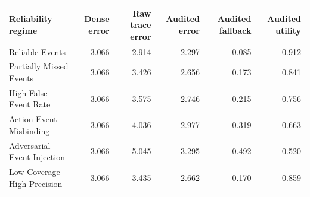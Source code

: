 \begin{tabular}{lrrrrr}
\toprule
Reliability regime & Dense error & Raw trace error & Audited error & Audited fallback & Audited utility \\
\midrule
Reliable Events & 3.066 & 2.914 & 2.297 & 0.085 & 0.912 \\
Partially Missed Events & 3.066 & 3.426 & 2.656 & 0.173 & 0.841 \\
High False Event Rate & 3.066 & 3.575 & 2.746 & 0.215 & 0.756 \\
Action Event Misbinding & 3.066 & 4.036 & 2.977 & 0.319 & 0.663 \\
Adversarial Event Injection & 3.066 & 5.045 & 3.295 & 0.492 & 0.520 \\
Low Coverage High Precision & 3.066 & 3.435 & 2.662 & 0.170 & 0.859 \\
\bottomrule
\end{tabular}
